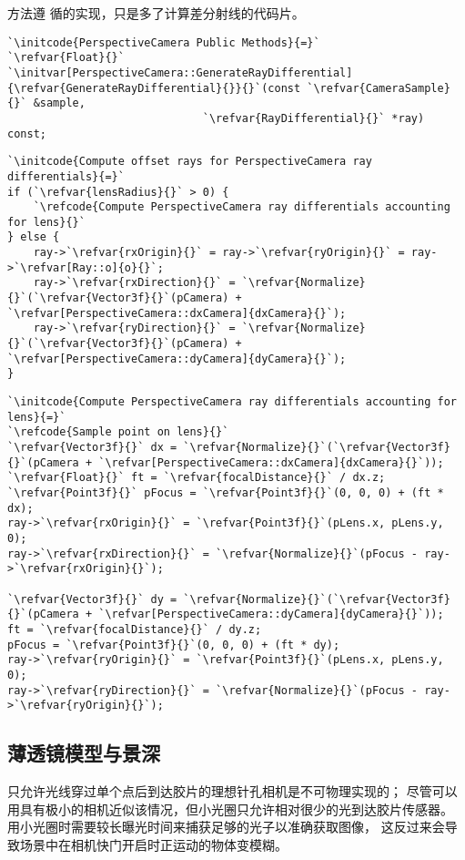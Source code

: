 方法遵
循的实现，只是多了计算差分射线的代码片。
\begin{lstlisting}
`\initcode{PerspectiveCamera Public Methods}{=}`
`\refvar{Float}{}` `\initvar[PerspectiveCamera::GenerateRayDifferential]{\refvar{GenerateRayDifferential}{}}{}`(const `\refvar{CameraSample}{}` &sample,
                              `\refvar{RayDifferential}{}` *ray) const;
\end{lstlisting}
\begin{lstlisting}
`\initcode{Compute offset rays for PerspectiveCamera ray differentials}{=}`
if (`\refvar{lensRadius}{}` > 0) {
    `\refcode{Compute PerspectiveCamera ray differentials accounting for lens}{}`
} else {
    ray->`\refvar{rxOrigin}{}` = ray->`\refvar{ryOrigin}{}` = ray->`\refvar[Ray::o]{o}{}`;
    ray->`\refvar{rxDirection}{}` = `\refvar{Normalize}{}`(`\refvar{Vector3f}{}`(pCamera) + `\refvar[PerspectiveCamera::dxCamera]{dxCamera}{}`);
    ray->`\refvar{ryDirection}{}` = `\refvar{Normalize}{}`(`\refvar{Vector3f}{}`(pCamera) + `\refvar[PerspectiveCamera::dyCamera]{dyCamera}{}`);
}
\end{lstlisting}
\begin{lstlisting}
`\initcode{Compute PerspectiveCamera ray differentials accounting for lens}{=}`
`\refcode{Sample point on lens}{}`
`\refvar{Vector3f}{}` dx = `\refvar{Normalize}{}`(`\refvar{Vector3f}{}`(pCamera + `\refvar[PerspectiveCamera::dxCamera]{dxCamera}{}`));
`\refvar{Float}{}` ft = `\refvar{focalDistance}{}` / dx.z;
`\refvar{Point3f}{}` pFocus = `\refvar{Point3f}{}`(0, 0, 0) + (ft * dx);
ray->`\refvar{rxOrigin}{}` = `\refvar{Point3f}{}`(pLens.x, pLens.y, 0);
ray->`\refvar{rxDirection}{}` = `\refvar{Normalize}{}`(pFocus - ray->`\refvar{rxOrigin}{}`);

`\refvar{Vector3f}{}` dy = `\refvar{Normalize}{}`(`\refvar{Vector3f}{}`(pCamera + `\refvar[PerspectiveCamera::dyCamera]{dyCamera}{}`));
ft = `\refvar{focalDistance}{}` / dy.z;
pFocus = `\refvar{Point3f}{}`(0, 0, 0) + (ft * dy);
ray->`\refvar{ryOrigin}{}` = `\refvar{Point3f}{}`(pLens.x, pLens.y, 0);
ray->`\refvar{ryDirection}{}` = `\refvar{Normalize}{}`(pFocus - ray->`\refvar{ryOrigin}{}`);
\end{lstlisting}

\subsection{薄透镜模型与景深}\label{sub:薄透镜模型与景深}
只允许光线穿过单个点后到达胶片的理想针孔相机是不可物理实现的；
尽管可以用具有极小的相机近似该情况，但小光圈只允许相对很少的光到达胶片传感器。
用小光圈时需要较长曝光时间来捕获足够的光子以准确获取图像，
这反过来会导致场景中在相机快门开启时正运动的物体变模糊。


